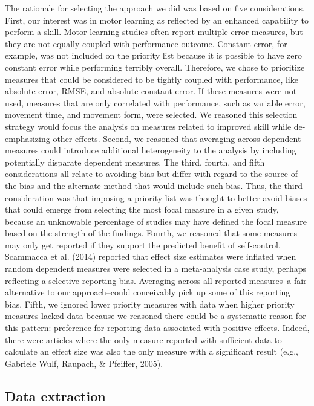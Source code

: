 \documentclass[
  english,
  man, donotrepeattitle,floatsintext]{apa7}
\begin{document}
The rationale for selecting the approach we did was based on five considerations. First, our interest was in motor learning as reflected by an enhanced capability to perform a skill. Motor learning studies often report multiple error measures, but they are not equally coupled with performance outcome. Constant error, for example, was not included on the priority list because it is possible to have zero constant error while performing terribly overall. Therefore, we chose to prioritize measures that could be considered to be tightly coupled with performance, like absolute error, RMSE, and absolute constant error. If these measures were not used, measures that are only correlated with performance, such as variable error, movement time, and movement form, were selected. We reasoned this selection strategy would focus the analysis on measures related to improved skill while de-emphasizing other effects. Second, we reasoned that averaging across dependent measures could introduce additional heterogeneity to the analysis by including potentially disparate dependent measures. The third, fourth, and fifth considerations all relate to avoiding bias but differ with regard to the source of the bias and the alternate method that would include such bias. Thus, the third consideration was that imposing a priority list was thought to better avoid biases that could emerge from selecting the most focal measure in a given study, because an unknowable percentage of studies may have defined the focal measure based on the strength of the findings. Fourth, we reasoned that some measures may only get reported if they support the predicted benefit of self-control. Scammacca et al. (2014) reported that effect size estimates were inflated when random dependent measures were selected in a meta-analysis case study, perhaps reflecting a selective reporting bias. Averaging across all reported measures--a fair alternative to our approach--could conceivably pick up some of this reporting bias. Fifth, we ignored lower priority measures with data when higher priority measures lacked data because we reasoned there could be a systematic reason for this pattern: preference for reporting data associated with positive effects. Indeed, there were articles where the only measure reported with sufficient data to calculate an effect size was also the only measure with a significant result (e.g., Gabriele Wulf, Raupach, \& Pfeiffer, 2005).

\hypertarget{data-extraction}{%
\subsection{Data extraction}\label{data-extraction}}
\end{document}
